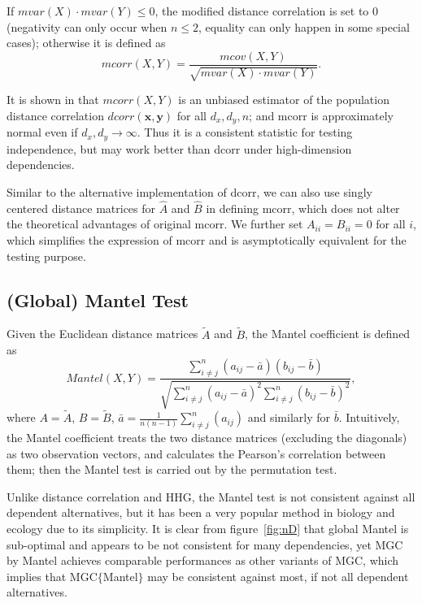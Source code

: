 \documentclass[11pt]{article}
\providecommand{\mb}[1]{\boldsymbol{#1}}
\begin{document}
If $mvar(X) \cdot mvar(Y) \leq 0$, the modified distance correlation is set to $0$ (negativity can only occur when $n\leq 2$, equality can only happen in some special cases); otherwise it is defined as
\begin{equation}
\label{mcorrEqu}
mcorr(X,Y)=\frac{mcov(X,Y)}{\sqrt{mvar(X) \cdot mvar(Y)}}.
\end{equation}

It is shown in \cite{SzekelyRizzo2013a} that $mcorr(X,Y)$ is an unbiased estimator of the population distance correlation $dcorr(\mb{x},\mb{y})$ for all $d_{x}, d_{y}, n$; and mcorr is approximately normal even if $d_{x},d_{y} \rightarrow \infty$. Thus it is a consistent statistic for testing independence, but may work better than dcorr under high-dimension dependencies. 

Similar to the alternative implementation of dcorr, we can also use singly centered distance matrices for $\hat{A}$ and $\hat{B}$ in defining mcorr, which does not alter the theoretical advantages of original mcorr. We further set $A_{ii}=B_{ii}=0$ for all $i$, which simplifies the expression of mcorr and is asymptotically equivalent for the testing purpose. %

\subsection{(Global) Mantel Test}
\label{appen:mantel}
Given the Euclidean distance matrices $\tilde{A}$ and $\tilde{B}$, the Mantel coefficient \cite{Mantel1967} is defined as 
\begin{equation}
Mantel(X,Y)=\frac{\sum_{i \neq j}^{n}(a_{ij}-\bar{a})(b_{ij}-\bar{b})}{\sqrt{\sum_{i \neq j}^{n}(a_{ij}-\bar{a})^2 \sum_{i \neq j}^{n}(b_{ij}-\bar{b})^2}},
\end{equation}
where $A=\tilde{A}$, $B=\tilde{B}$, $\bar{a}=\frac{1}{n(n-1)}\sum_{i \neq j}^{n}(a_{ij})$ and similarly for $\bar{b}$. Intuitively, the Mantel coefficient treats the two distance matrices (excluding the diagonals) as two observation vectors, and calculates the Pearson's correlation between them; then the Mantel test is carried out by the permutation test.

Unlike distance correlation and HHG, the Mantel test is not consistent against all dependent alternatives, but it has been a very popular method in biology and ecology due to its simplicity. It is clear from figure~\ref{fig:nD} that global Mantel is sub-optimal and appears to be not consistent for many dependencies, yet MGC by Mantel achieves comparable performances as other variants of MGC, which implies that MGC$\{$Mantel$\}$ may be consistent against most, if not all dependent alternatives.
\end{document}
